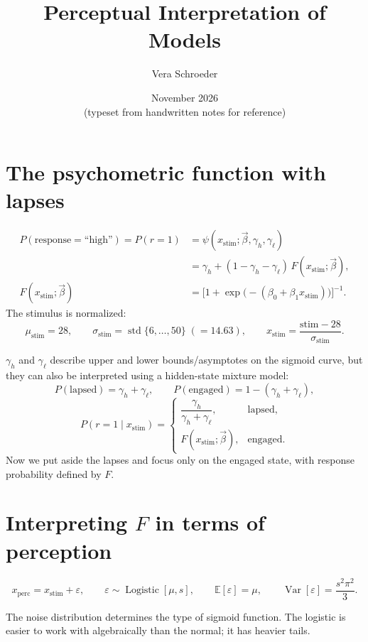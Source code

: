 \documentclass[11pt]{article}
\title{Perceptual Interpretation of Models}
\author{Vera Schroeder}
\date{November 2026\\[4pt]\small(typeset from handwritten notes for reference)}
\newcommand{\xs}{x_{\text{stim}}}
\newcommand{\xp}{x_{\text{perc}}}
\newcommand{\high}{\text{``high''}}
\newcommand{\bvec}{\vec{\beta}}
\begin{document}
\maketitle
\tableofcontents
\newpage

\section{The psychometric function with lapses}

\begin{align*}
  P(\text{response} = \high) = P(r = 1)
  &= \psi(\xs; \bvec, \gamma_h, \gamma_\ell)\\
  &= \gamma_h + (1-\gamma_h-\gamma_\ell)\,F(\xs; \bvec),\\
  F(\xs; \bvec) &= \bigl[1+\exp\bigl(-(\beta_0+\beta_1\xs)\bigr)\bigr]^{-1}.
\end{align*}
The stimulus is normalized:
\[
  \mu_{\text{stim}} = 28, \qquad
  \sigma_{\text{stim}} = \operatorname{std}\{6,\dots,50\} \;(=14.63), \qquad
  \xs = \frac{\text{stim} - 28}{\sigma_{\text{stim}}}.
\]

$\gamma_h$ and $\gamma_\ell$ describe upper and lower bounds/asymptotes on the sigmoid
curve, but they can also be interpreted using a hidden-state mixture model:
\[
  P(\text{lapsed}) = \gamma_h + \gamma_\ell, \qquad
  P(\text{engaged}) = 1 - (\gamma_h + \gamma_\ell),
\]
\[
  P(r = 1 \mid \xs) =
  \begin{cases}
    \dfrac{\gamma_h}{\gamma_h+\gamma_\ell}, & \text{lapsed},\\[10pt]
    F(\xs; \bvec), & \text{engaged}.
  \end{cases}
\]
Now we put aside the lapses and focus only on the engaged state, with response
probability defined by $F$.

\section{Interpreting $F$ in terms of perception}

\[
  \xp = \xs + \varepsilon, \qquad \varepsilon \sim \operatorname{Logistic}[\mu, s],
  \qquad
  \mathbb{E}[\varepsilon] = \mu, \qquad \operatorname{Var}[\varepsilon] = \frac{s^2\pi^2}{3}.
\]

\begin{aside}
The noise distribution determines the type of sigmoid function. The logistic is
easier to work with algebraically than the normal; it has heavier tails.
\end{aside}
\end{document}

